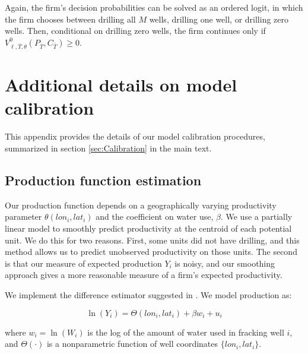 \documentclass[12pt]{article}
\begin{document}
Again, the firm's decision probabilities can be solved as an ordered logit, in which the firm chooses between drilling all $M$ wells, drilling one well, or drilling zero wells. Then, conditional on drilling zero wells, the firm continues only if $V^0_{\ell,\bar{T},\theta}(P_{\bar{T}},C_{\bar{T}}) \geq 0$.


\section{Additional details on model calibration \label{appx:calibration}}

This appendix provides the details of our model calibration procedures, summarized in section \ref{sec:Calibration} in the main text.

\subsection{Production function estimation}

Our production function depends on a geographically varying productivity parameter $\theta(lon_i,lat_i)$ and the coefficient on water use, $\beta$. We use a partially linear model to smoothly predict productivity at the centroid of each potential unit. We do this for two reasons. First, some units did not have drilling, and this method allows us to predict unobserved productivity on those units. The second is that our measure of expected production $Y_i$ is noisy, and our smoothing approach gives a more reasonable measure of a firm's expected productivity.

We implement the difference estimator suggested in \citet{bib:robinson}. We model production as:

\begin{equation}
\ln(Y_i) = \Theta(lon_i,lat_i) + \beta w_i + u_i
\end{equation}

\noindent where $w_i = \ln(W_i)$ is the log of the amount of water used in fracking well $i$, and $\Theta(\cdot)$ is a nonparametric function of well coordinates $\{lon_i,lat_i\}$.

\end{document}
